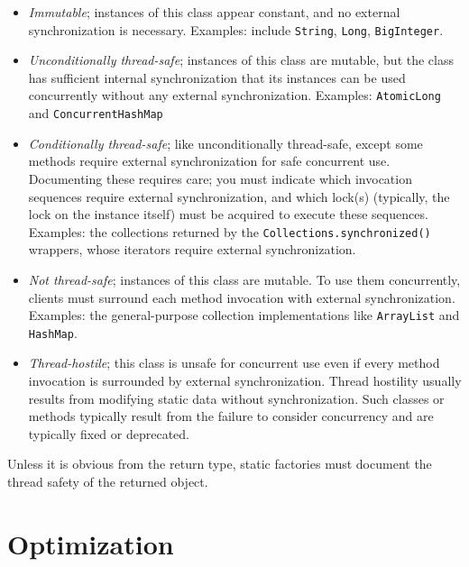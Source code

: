 \documentclass[8pt, table, xcdraw]{article}%
\begin{document}
\begin{itemize}
    \item \emph{Immutable}; instances of this class appear constant, and no external synchronization is necessary. Examples: include \lstinline{String}, \lstinline{Long}, \lstinline{BigInteger}.
    \item \emph{Unconditionally thread-safe}; instances of this class are mutable, but the class has sufficient internal synchronization that its instances can be used concurrently without any external synchronization. Examples: \lstinline{AtomicLong} and \lstinline{ConcurrentHashMap}
    \item \emph{Conditionally thread-safe}; like unconditionally thread-safe, except some methods require external synchronization for safe concurrent use. Documenting these requires care; you must indicate which invocation sequences require external synchronization, and which lock(s) (typically, the lock on the instance itself) must be acquired to execute these sequences. Examples: the collections returned by the \lstinline{Collections.synchronized()} wrappers, whose iterators require external synchronization.
    \item \emph{Not thread-safe}; instances of this class are mutable. To use them concurrently, clients must surround each method invocation with external synchronization. Examples: the general-purpose collection implementations like \lstinline{ArrayList} and \lstinline{HashMap}.
    \item \emph{Thread-hostile}; this class is unsafe for concurrent use even if every method invocation is surrounded by external synchronization. Thread hostility usually results from modifying static data without synchronization. Such classes or methods typically result from the failure to consider concurrency and are typically fixed or deprecated.
\end{itemize}

Unless it is obvious from the return type, static factories must document the thread safety of the returned object.

\section{Optimization}
\end{document}
